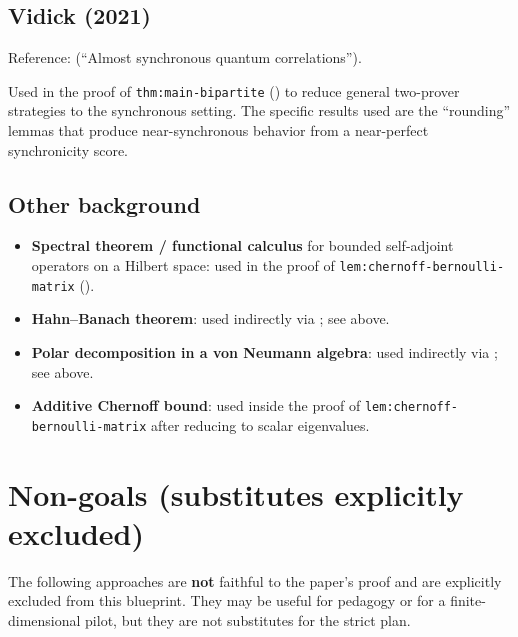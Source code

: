 \documentclass{article}
\theoremstyle{remark}
\begin{document}
\subsection{Vidick (2021)}

Reference: \cite{vidick2021almost}
(``Almost synchronous quantum correlations'').

Used in the proof of \texttt{thm:main-bipartite}
() to reduce general two-prover strategies to
the synchronous setting. The specific results used are the ``rounding''
lemmas that produce near-synchronous behavior from a near-perfect
synchronicity score.

\subsection{Other background}

\begin{itemize}
	\item \textbf{Spectral theorem / functional calculus} for bounded
	      self-adjoint operators on a Hilbert space: used in the proof of
	      \texttt{lem:chernoff-bernoulli-matrix} ().
	\item \textbf{Hahn--Banach theorem}: used indirectly via
	      \cite{de2021orthogonalization}; see above.
	\item \textbf{Polar decomposition in a von Neumann algebra}: used
	      indirectly via \cite{de2021orthogonalization}; see above.
	\item \textbf{Additive Chernoff bound}: used inside the proof of
	      \texttt{lem:chernoff-bernoulli-matrix} after reducing to scalar eigenvalues.
\end{itemize}

\section{Non-goals (substitutes explicitly excluded)}
\label{sec:nongoals}

The following approaches are \textbf{not} faithful to the paper's proof and are
explicitly excluded from this blueprint. They may be useful for pedagogy or for
a finite-dimensional pilot, but they are not substitutes for the strict plan.
\end{document}
